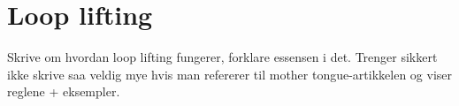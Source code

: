 \section{Loop lifting}
\label{sect:method:loop_lifting}


Skrive om hvordan loop lifting fungerer, forklare essensen i det. Trenger
sikkert ikke skrive saa veldig mye hvis man refererer til mother
tongue-artikkelen og viser reglene + eksempler. 